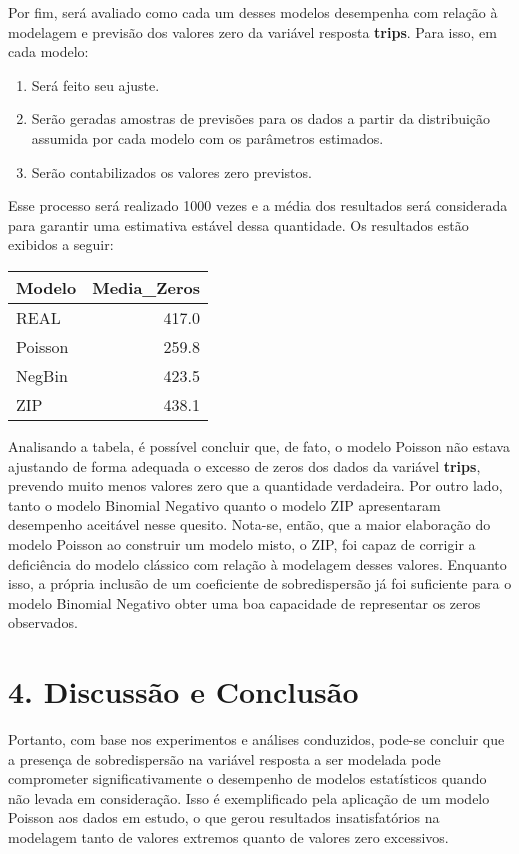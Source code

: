 \documentclass[
]{article}
\providecommand{\tightlist}{%
  \setlength{\itemsep}{0pt}\setlength{\parskip}{0pt}}
\begin{document}
Por fim, será avaliado como cada um desses modelos desempenha com
relação à modelagem e previsão dos valores zero da variável resposta
\textbf{trips}. Para isso, em cada modelo:

\begin{enumerate}
\def\labelenumi{\arabic{enumi}.}
\tightlist
\item
  Será feito seu ajuste.
\item
  Serão geradas amostras de previsões para os dados a partir da
  distribuição assumida por cada modelo com os parâmetros estimados.
\item
  Serão contabilizados os valores zero previstos.
\end{enumerate}

Esse processo será realizado 1000 vezes e a média dos resultados será
considerada para garantir uma estimativa estável dessa quantidade. Os
resultados estão exibidos a seguir:

\begin{longtable}[]{@{}lr@{}}
\toprule\noalign{}
Modelo & Media\_Zeros \\
\midrule\noalign{}
\endhead
\bottomrule\noalign{}
\endlastfoot
REAL & 417.0 \\
Poisson & 259.8 \\
NegBin & 423.5 \\
ZIP & 438.1 \\
\end{longtable}

Analisando a tabela, é possível concluir que, de fato, o modelo Poisson
não estava ajustando de forma adequada o excesso de zeros dos dados da
variável \textbf{trips}, prevendo muito menos valores zero que a
quantidade verdadeira. Por outro lado, tanto o modelo Binomial Negativo
quanto o modelo ZIP apresentaram desempenho aceitável nesse quesito.
Nota-se, então, que a maior elaboração do modelo Poisson ao construir um
modelo misto, o ZIP, foi capaz de corrigir a deficiência do modelo
clássico com relação à modelagem desses valores. Enquanto isso, a
própria inclusão de um coeficiente de sobredispersão já foi suficiente
para o modelo Binomial Negativo obter uma boa capacidade de representar
os zeros observados.

\section{4. Discussão e Conclusão}\label{discussuxe3o-e-conclusuxe3o}

Portanto, com base nos experimentos e análises conduzidos, pode-se
concluir que a presença de sobredispersão na variável resposta a ser
modelada pode comprometer significativamente o desempenho de modelos
estatísticos quando não levada em consideração. Isso é exemplificado
pela aplicação de um modelo Poisson aos dados em estudo, o que gerou
resultados insatisfatórios na modelagem tanto de valores extremos quanto
de valores zero excessivos.
\end{document}
